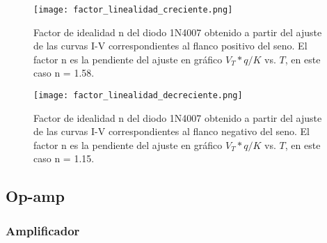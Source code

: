 \documentclass[a4paper, 11pt]{article}
\begin{document}
\begin{figure} [H]
\centering
\texttt{[image: factor\_linealidad\_creciente.png]}
\caption{Factor de idealidad n del diodo 1N4007 obtenido a partir del ajuste de las curvas I-V correspondientes al flanco positivo del seno. El factor n es la pendiente del ajuste en gráfico $V_T*q/K$ vs. $ T$, en este caso n = 1.58.\label{fig:factor_linealidad_creciente}}
\end{figure} 

\begin{figure} [H]
\centering
\texttt{[image: factor\_linealidad\_decreciente.png]}
\caption{Factor de idealidad n del diodo 1N4007 obtenido a partir del ajuste de las curvas I-V correspondientes al flanco negativo del seno.  El factor n es la pendiente del ajuste en gráfico $V_T*q/K$ vs. $ T$, en este caso n = 1.15.\label{fig:factor_linealidad_decreciente}}
\end{figure} 



\subsection*{Op-amp}

%
%
%


\subsubsection*{Amplificador}
\end{document}
